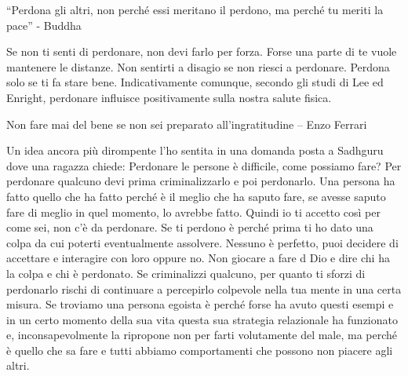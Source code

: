 \documentclass[12pt]{book} %
\begin{document}
“Perdona gli altri, non perché essi meritano il perdono, ma perché tu meriti la pace” - Buddha

Se non ti senti di perdonare, non devi farlo per forza. Forse una parte di te vuole mantenere le distanze. Non
sentirti a disagio se non riesci a perdonare. Perdona solo se ti fa stare bene. Indicativamente comunque, secondo gli studi di Lee ed Enright, perdonare influisce
positivamente sulla nostra salute fisica.

Non fare mai del bene se non sei preparato all'ingratitudine – Enzo Ferrari

Un idea ancora più dirompente l'ho sentita in una domanda posta a Sadhguru dove una ragazza chiede: Perdonare le persone è difficile, come possiamo fare?
Per perdonare qualcuno devi prima criminalizzarlo e poi perdonarlo. 
Una persona ha fatto quello che ha fatto perché è il meglio che ha saputo fare, se avesse saputo fare di meglio in quel momento, lo avrebbe fatto. Quindi io ti accetto così per come sei, non c'è da perdonare. Se ti perdono è perché prima ti ho dato una colpa da cui poterti eventualmente assolvere. Nessuno è perfetto, puoi decidere di accettare e interagire con loro oppure no. Non giocare a fare d
Dio e dire chi ha la colpa e chi è perdonato. Se criminalizzi qualcuno, per quanto ti sforzi di perdonarlo rischi di continuare a percepirlo colpevole nella tua mente in una certa misura.
Se troviamo una persona egoista è perché forse ha avuto questi esempi e in un certo momento della sua vita questa sua strategia relazionale ha funzionato e, inconsapevolmente la ripropone non per farti volutamente del male, ma perché è quello che sa fare e tutti abbiamo comportamenti che possono non piacere agli altri.
\end{document}
